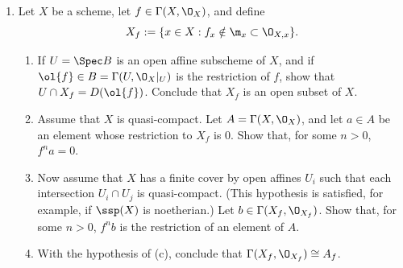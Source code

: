 \documentclass[12pt]{amsart}
\begin{document}
\begin{enumerate}
  \item[2.16.] {
      Let $X$ be a scheme, let $f\in \Gamma(X,\O_X)$, and define 
      \[
        X_f:=\{x\in X: f_x\notin \m_x\subset \O_{X,x}\}.
      \]
      \begin{enumerate}
        \item If $U=\Spec B$ is an open affine subscheme of $X$, and if $\ol{f}\in B=\Gamma(U,\O_X|_U)$ is the restriction of $f$, show that $U\cap X_f=D(\ol{f})$.
          Conclude that $X_f$ is an open subset of $X$.
        \item Assume that $X$ is quasi-compact. Let $A=\Gamma(X,\O_X)$, and let $a\in A$ be an element whose restriction to $X_f$ is $0$.
          Show that, for some $n>0$, $f^na=0$.
        \item Now assume that $X$ has a finite cover by open affines $U_i$ such that each intersection $U_i\cap U_j$ is quasi-compact. 
          (This hypothesis is satisfied, for example, if $\ssp(X)$ is noetherian.)
          Let $b\in \Gamma(X_f,\O_{X_f})$.
          Show that, for some $n>0$, $f^nb$ is the restriction of an element of $A$.
        \item With the hypothesis of (c), conclude that $\Gamma(X_f,\O_{X_f})\cong A_f$.
      \end{enumerate}
    }
\end{enumerate}
\end{document}
